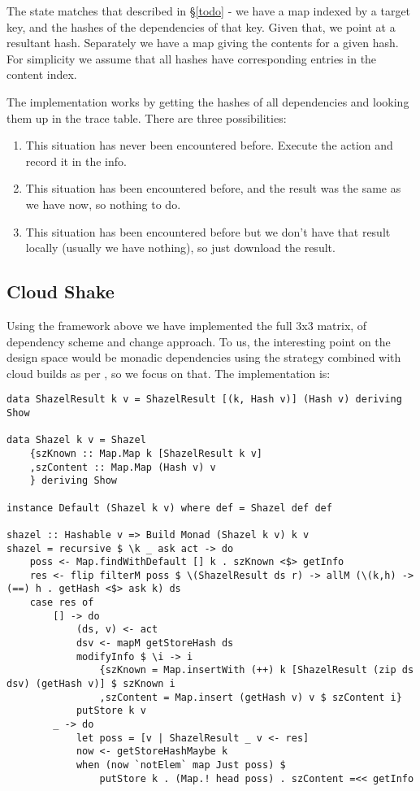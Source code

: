 The state matches that described in \S\ref{todo} - we have a map indexed by a target key, and the hashes of the dependencies of that key. Given that, we point at a resultant hash. Separately we have a map giving the contents for a given hash. For simplicity we assume that all hashes have corresponding entries in the content index.

The implementation works by getting the hashes of all dependencies and looking them up in the trace table. There are three possibilities:

\begin{enumerate}
\item This situation has never been encountered before. Execute the action and record it in the info.
\item This situation has been encountered before, and the result was the same as we have now, so nothing to do.
\item This situation has been encountered before but we don't have that result locally (usually we have nothing), so just download the result.
\end{enumerate}

\subsection{Cloud Shake}

Using the framework above we have implemented the full 3x3 matrix, of dependency scheme and change approach. To us, the interesting point on the design space would be monadic dependencies using the  strategy combined with cloud builds as per \Bazel, so we focus on that. The implementation is:

\begin{verbatim}
data ShazelResult k v = ShazelResult [(k, Hash v)] (Hash v) deriving Show

data Shazel k v = Shazel
    {szKnown :: Map.Map k [ShazelResult k v]
    ,szContent :: Map.Map (Hash v) v
    } deriving Show

instance Default (Shazel k v) where def = Shazel def def

shazel :: Hashable v => Build Monad (Shazel k v) k v
shazel = recursive $ \k _ ask act -> do
    poss <- Map.findWithDefault [] k . szKnown <$> getInfo
    res <- flip filterM poss $ \(ShazelResult ds r) -> allM (\(k,h) -> (==) h . getHash <$> ask k) ds
    case res of
        [] -> do
            (ds, v) <- act
            dsv <- mapM getStoreHash ds
            modifyInfo $ \i -> i
                {szKnown = Map.insertWith (++) k [ShazelResult (zip ds dsv) (getHash v)] $ szKnown i
                ,szContent = Map.insert (getHash v) v $ szContent i}
            putStore k v
        _ -> do
            let poss = [v | ShazelResult _ v <- res]
            now <- getStoreHashMaybe k
            when (now `notElem` map Just poss) $
                putStore k . (Map.! head poss) . szContent =<< getInfo
\end{verbatim}


